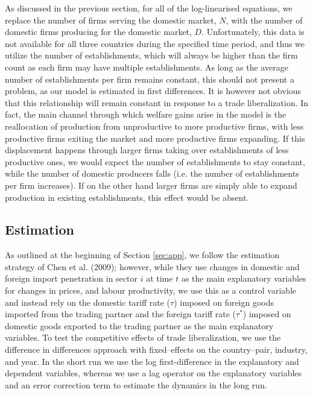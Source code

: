 As discussed in the previous section, for all of the log-linearised equations, 
we replace the number of firms serving the domestic market, $N$, with the number 
of domestic firms producing for the domestic market, $D$. Unfortunately, this 
data is not available for all three countries during the specified time period, 
and thus we utilize the number of establishments, which will always be higher 
than the firm count as each firm may have multiple establishments. As long as 
the average number of establishments per firm remains constant, this should not 
present a problem, as our model is estimated in first differences. It is however 
not obvious that this relationship will remain constant in response to a trade 
liberalization. In fact, the main channel through which welfare gains arise in 
the model is the reallocation of production from unproductive to more productive 
firms, with less productive firms exiting the market and more productive firms 
expanding. If this displacement happens through larger firms taking over 
establishments of less productive ones, we would expect the number of establishments 
to stay constant, while the number of domestic producers falls (i.e. the number 
of establishments per firm increases). If on the other hand larger firms are simply 
able to expand production in existing establishments, this effect would be absent.  


\subsection{Estimation}
As outlined at the beginning of Section \ref{sec:app}, we follow the estimation 
strategy of Chen et al. (2009); however, while they use changes in domestic and 
foreign import penetration in sector $i$ at time $t$ as the main explanatory 
variables for changes in prices, and labour productivity, we use this as
 a control variable and instead rely on the domestic tariff rate ($\tau$) 
imposed on foreign goods imported from the trading partner and the foreign tariff 
rate ($\tau^*$) imposed on domestic goods exported to the trading partner as the 
main explanatory variables. To test the competitive effects of trade liberalization, 
we use the difference in differences approach with fixed--effects on the 
country--pair, industry, and year. In the short run we use the log first-difference 
in the explanatory and dependent variables, whereas we use a lag 
operator on the explanatory variables and an error correction term to estimate the
 dynamics in the long run. 

